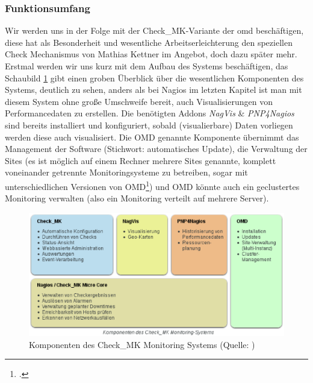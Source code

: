 \documentclass[12pt,a4paper,parskip,listof=totoc,bibliography=totoc]{scrreprt}
\begin{document}
	\subsubsection{Funktionsumfang}
	Wir werden uns in der Folge mit der Check\_MK-Variante der \acrshort{omd} beschäftigen, diese hat als Besonderheit und wesentliche Arbeitserleichterung den speziellen Check Mechanismus von Mathias Kettner im Angebot, doch dazu später mehr. Erstmal werden wir uns kurz mit dem Aufbau des Systems beschäftigen, das Schaubild \ref{fig:checkmk} gibt einen groben Überblick über die wesentlichen Komponenten des Systems, deutlich zu sehen, anders als bei Nagios im letzten Kapitel ist man mit diesem System ohne große Umschweife bereit, auch Visualisierungen von Performancedaten zu erstellen. Die benötigten Addons \textit{NagVis} \& \textit{PNP4Nagios} sind bereits installiert und konfiguriert, sobald (visualierbare) Daten vorliegen werden diese auch visualisiert. Die OMD genannte Komponente übernimmt das Management der Software (Stichwort: automatisches Update), die Verwaltung der Sites (es ist möglich auf einem Rechner mehrere Sites genannte, komplett voneinander getrennte Monitoringsysteme zu betreiben, sogar mit unterschiedlichen Versionen von OMD\footcite{omdhomepage}) und OMD könnte auch ein geclustertes Monitoring verwalten (also ein Monitoring verteilt auf mehrere Server).
	\begin{figure}
		\centering
		\includegraphics[width=1\textwidth]{pics/checkMKAufbau.eps}
		\caption[Komponenten des Check\_MK Monitoring Systems]{Komponenten des Check\_MK Monitoring Systems (Quelle: \cite{checkmkmonitoringpic})}
		\label{fig:checkmk}
	\end{figure}
\end{document}
